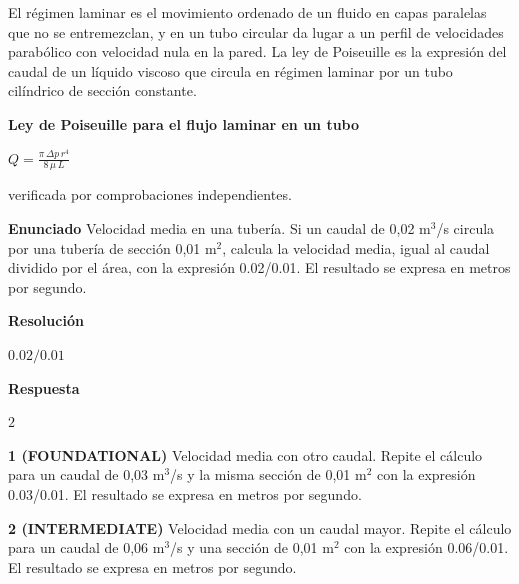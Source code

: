 \documentclass{book}
\begin{document}
\begin{tcolorbox}[title={Definición}, studiumdef, breakable]

El régimen laminar es el movimiento ordenado de un fluido en capas paralelas que no se entremezclan, y en un tubo circular da lugar a un perfil de velocidades parabólico con velocidad nula en la pared. La ley de Poiseuille es la expresión del caudal de un líquido viscoso que circula en régimen laminar por un tubo cilíndrico de sección constante.
\end{tcolorbox}

\begin{tcolorbox}[title={Derivaciones}, studiumdef, breakable]

\noindent\textbf{Ley de Poiseuille para el flujo laminar en un tubo}

\(Q = \frac{\pi\,\Delta p\, r^{4}}{8\,\mu\,L}\)

\noindent\footnotesize verificada por comprobaciones independientes.
\end{tcolorbox}

\begin{tcolorbox}[title={Problema resuelto}, studiumworked, breakable]

\noindent\textbf{Enunciado}
Velocidad media en una tubería. Si un caudal de 0,02 m\(^{3}\)/s circula por una tubería de sección 0,01 m\(^{2}\), calcula la velocidad media, igual al caudal dividido por el área, con la expresión 0.02/0.01. El resultado se expresa en metros por segundo.

\noindent\textbf{Resolución}

\(0.02/0.01\)

\noindent\textbf{Respuesta}

\(2\)
\end{tcolorbox}

\begin{tcolorbox}[title={Ejercicios}, studiumworked, breakable]

\noindent\textbf{1 (FOUNDATIONAL)}
Velocidad media con otro caudal. Repite el cálculo para un caudal de 0,03 m\(^{3}\)/s y la misma sección de 0,01 m\(^{2}\) con la expresión 0.03/0.01. El resultado se expresa en metros por segundo.

\noindent\textbf{2 (INTERMEDIATE)}
Velocidad media con un caudal mayor. Repite el cálculo para un caudal de 0,06 m\(^{3}\)/s y una sección de 0,01 m\(^{2}\) con la expresión 0.06/0.01. El resultado se expresa en metros por segundo.
\end{tcolorbox}
\end{document}
